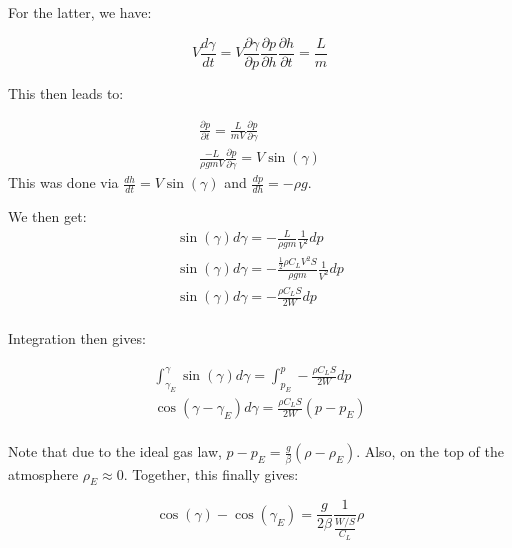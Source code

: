 For the latter, we have:

\begin{equation}
    V \frac{d \gamma}{dt} = V \frac{\partial \gamma}{\partial p} \frac{\partial p}{\partial h} \frac{\partial h}{\partial t}  = \frac{L}{m}
\end{equation}

This then leads to:

\begin{equation}
\begin{split}
     \frac{\partial p}{\partial t} = \frac{L}{m V} \frac{\partial p}{\partial \gamma} \\ 
    \frac{-L}{\rho g m V} \frac{\partial p}{\partial \gamma} = V \sin{(\gamma)}
\end{split}
\end{equation}
This was done via $\frac{dh}{dt} = V\sin{(\gamma)}$ and $\frac{d p}{d h} = -\rho g$.

We then get:
\begin{equation}
\begin{split}
     \sin{(\gamma)}d\gamma = - \frac{L}{\rho g m} \frac{1}{V^2} dp \\
     \sin{(\gamma)}d\gamma = - \frac{\frac{1}{2}\rho C_L V^2 S}{\rho g m} \frac{1}{V^2} dp \\
     \sin{(\gamma)}d\gamma = - \frac{\rho C_L S}{2 W} dp \\
\end{split}
\end{equation}

Integration then gives:

\begin{equation}
    \begin{split}
        \int_{\gamma_E}^{\gamma} \sin{(\gamma)}d\gamma = \int_{p_E}^p - \frac{\rho C_L S}{2 W} dp \\
        \cos{(\gamma - \gamma_E)}d\gamma =  \frac{\rho C_L S}{2 W} (p-p_E) \\
    \end{split}
\end{equation}

Note that due to the ideal gas law, $p-p_E = \frac{g}{\beta} (\rho - \rho_E)$. Also, on the top of the atmosphere $\rho_E \approx 0$. Together, this finally gives:

\begin{equation}
    \cos{(\gamma)} - \cos{(\gamma_E)} =  \frac{g}{2 \beta} \frac{1}{\frac{W/S}{C_L}} \rho 
\end{equation}


